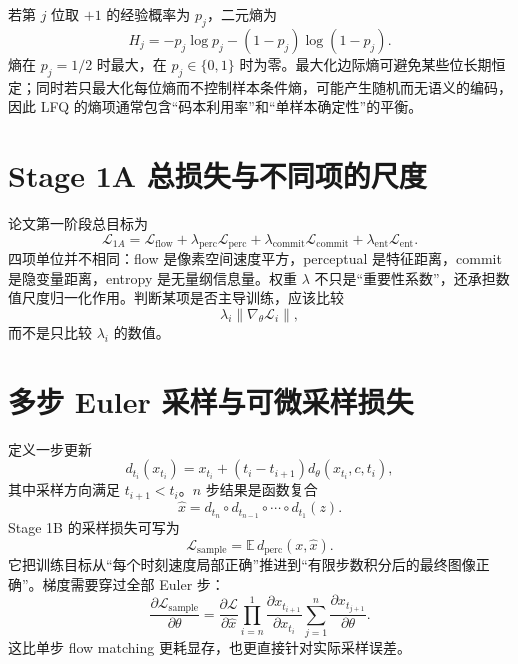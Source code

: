 \documentclass[UTF8,12pt,a4paper,fontset=none]{ctexart}
\numberwithin{equation}{section}
\newcommand{\E}{\mathbb{E}}
\newcommand{\Loss}{\mathcal{L}}
\newcommand{\norm}[1]{\left\lVert #1\right\rVert}
\begin{document}
若第 $j$ 位取 $+1$ 的经验概率为 $p_j$，二元熵为
\begin{equation}
 H_j=-p_j\log p_j-(1-p_j)\log(1-p_j).
\end{equation}
熵在 $p_j=1/2$ 时最大，在 $p_j\in\{0,1\}$ 时为零。最大化边际熵可避免某些位长期恒定；同时若只最大化每位熵而不控制样本条件熵，可能产生随机而无语义的编码，因此 LFQ 的熵项通常包含“码本利用率”和“单样本确定性”的平衡。

\section{Stage 1A 总损失与不同项的尺度}
论文第一阶段总目标为
\begin{equation}
 \Loss_{1A}=\Loss_{\mathrm{flow}}
 +\lambda_{\mathrm{perc}}\Loss_{\mathrm{perc}}
 +\lambda_{\mathrm{commit}}\Loss_{\mathrm{commit}}
 +\lambda_{\mathrm{ent}}\Loss_{\mathrm{ent}}.
\end{equation}
四项单位并不相同：flow 是像素空间速度平方，perceptual 是特征距离，commit 是隐变量距离，entropy 是无量纲信息量。权重 $\lambda$ 不只是“重要性系数”，还承担数值尺度归一化作用。判断某项是否主导训练，应该比较
\begin{equation}
 \lambda_i\norm{\nabla_\theta\Loss_i},
\end{equation}
而不是只比较 $\lambda_i$ 的数值。

\section{多步 Euler 采样与可微采样损失}
定义一步更新
\begin{equation}
 d_{t_i}(x_{t_i})
 =x_{t_i}+(t_i-t_{i+1})d_\theta(x_{t_i},c,t_i),
\end{equation}
其中采样方向满足 $t_{i+1}<t_i$。$n$ 步结果是函数复合
\begin{equation}
 \hat x=d_{t_n}\circ d_{t_{n-1}}\circ\cdots\circ d_{t_1}(z).
\end{equation}
Stage 1B 的采样损失可写为
\begin{equation}
 \boxed{\Loss_{\mathrm{sample}}
 =\E\,d_{\mathrm{perc}}(x,\hat x).}
\end{equation}
它把训练目标从“每个时刻速度局部正确”推进到“有限步数积分后的最终图像正确”。梯度需要穿过全部 Euler 步：
\begin{equation}
 \frac{\partial\Loss_{\mathrm{sample}}}{\partial\theta}
 =\frac{\partial\Loss}{\partial\hat x}
 \prod_{i=n}^{1}\frac{\partial x_{t_{i+1}}}{\partial x_{t_i}}
 \sum_{j=1}^{n}\frac{\partial x_{t_{j+1}}}{\partial\theta}.
\end{equation}
这比单步 flow matching 更耗显存，也更直接针对实际采样误差。
\end{document}
